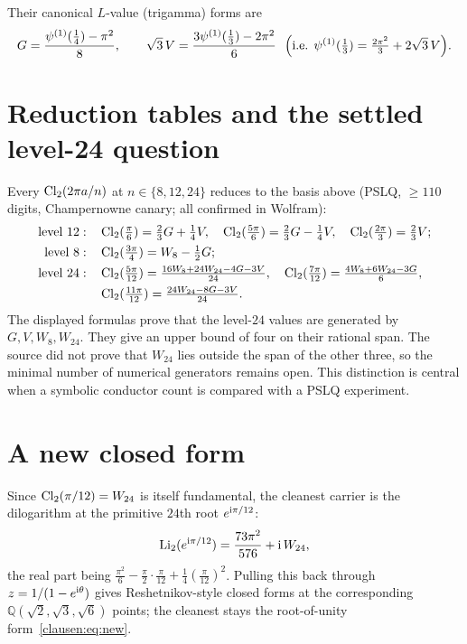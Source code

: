 Their canonical $L$-value (trigamma) forms are
\begin{equation}\label{clausen:eq:trig}
  G=\frac{\psi^{(1)}(\tfrac14)-\pi^2}{8},\qquad
  \sqrt3\,V=\frac{3\psi^{(1)}(\tfrac13)-2\pi^2}{6}\ \ \Bigl(\text{i.e. }\psi^{(1)}(\tfrac13)=\tfrac{2\pi^2}3+2\sqrt3\,V\Bigr).
\end{equation}

\section{Reduction tables and the settled level-24 question}
Every $\operatorname{Cl}_2(2\pi a/n)$ at $n\in\{8,12,24\}$ reduces to the basis above (PSLQ, $\ge110$ digits,
Champernowne canary; all confirmed in Wolfram):
\begin{align*}
\text{level }12:\quad
  &\operatorname{Cl}_2(\tfrac\pi6)=\tfrac23G+\tfrac14V,\quad \operatorname{Cl}_2(\tfrac{5\pi}6)=\tfrac23G-\tfrac14V,\quad
  \operatorname{Cl}_2(\tfrac{2\pi}3)=\tfrac23V;\\
\text{level }8:\quad
  &\operatorname{Cl}_2(\tfrac{3\pi}4)=W_8-\tfrac12G;\\
\text{level }24:\quad
  &\operatorname{Cl}_2(\tfrac{5\pi}{12})=\tfrac{16W_8+24W_{24}-4G-3V}{24},\quad
  \operatorname{Cl}_2(\tfrac{7\pi}{12})=\tfrac{4W_8+6W_{24}-3G}{6},\\
  &\operatorname{Cl}_2(\tfrac{11\pi}{12})=\tfrac{24W_{24}-8G-3V}{24}.
\end{align*}
The displayed formulas prove that the level-$24$ values are generated by
$G,V,W_8,W_{24}$. They give an upper bound of four on their rational span.
The source did not prove that $W_{24}$ lies outside the span of the other
three, so the minimal number of numerical generators remains open.
This distinction is central when a symbolic conductor count is compared
with a PSLQ experiment.

\section{A new closed form}
Since $\operatorname{Cl}_2(\pi/12)=W_{24}$ is itself fundamental, the cleanest carrier is the dilogarithm at the
primitive $24$th root $e^{\mathrm{i}\pi/12}$:
\begin{equation}\label{clausen:eq:new}
  \operatorname{Li}_2(e^{\mathrm{i}\pi/12})=\frac{73\pi^2}{576}+\mathrm{i}\,W_{24},
\end{equation}
the real part being $\tfrac{\pi^2}6-\tfrac{\pi}{2}\!\cdot\!\tfrac\pi{12}+\tfrac14(\tfrac\pi{12})^2$. Pulling
this back through $z=1/(1-e^{\mathrm{i}\theta})$ gives Reshetnikov-style closed forms at the corresponding
$\mathbb Q(\sqrt2,\sqrt3,\sqrt6)$ points; the cleanest stays the root-of-unity form~\eqref{clausen:eq:new}.

